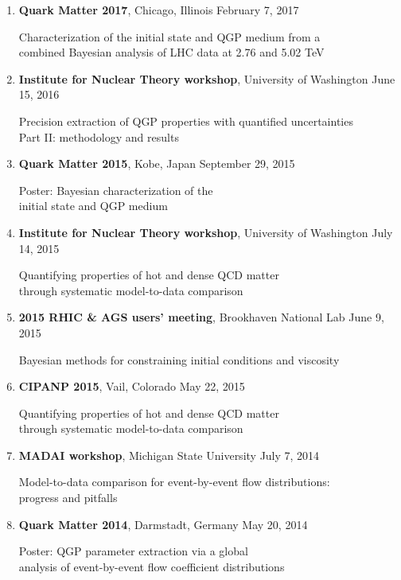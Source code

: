 \documentclass[letterpaper,10pt]{article}
\newcommand{\entry}[3]{\vspace{.5em plus .1em minus .1em}\textbf{#1}, #2 \hfill #3}
\begin{document}
\begin{enumerate}
  \item \entry{Quark Matter 2017}{Chicago, Illinois}{February 7, 2017} \par
    Characterization of the initial state and QGP medium from a \\
    combined Bayesian analysis of LHC data at 2.76 and 5.02 TeV

  \item \entry{Institute for Nuclear Theory workshop}{University of Washington}{June 15, 2016} \par
    Precision extraction of QGP properties with quantified uncertainties \\
    Part II: methodology and results

  \item \entry{Quark Matter 2015}{Kobe, Japan}{September 29, 2015} \par
    Poster: Bayesian characterization of the \\
    initial state and QGP medium

  \item \entry{Institute for Nuclear Theory workshop}{University of Washington}{July 14, 2015} \par
    Quantifying properties of hot and dense QCD matter \\
    through systematic model-to-data comparison

  \item \entry{2015 RHIC \& AGS users' meeting}{Brookhaven National Lab}{June 9, 2015} \par
    Bayesian methods for constraining initial conditions and viscosity

  \item \entry{CIPANP 2015}{Vail, Colorado}{May 22, 2015} \par
    Quantifying properties of hot and dense QCD matter \\
    through systematic model-to-data comparison

  \item \entry{MADAI workshop}{Michigan State University}{July 7, 2014} \par
    Model-to-data comparison for event-by-event flow distributions: \\
    progress and pitfalls

  \item \entry{Quark Matter 2014}{Darmstadt, Germany}{May 20, 2014} \par
    Poster: QGP parameter extraction via a global \\
    analysis of event-by-event flow coefficient distributions


\end{enumerate}
\end{document}

